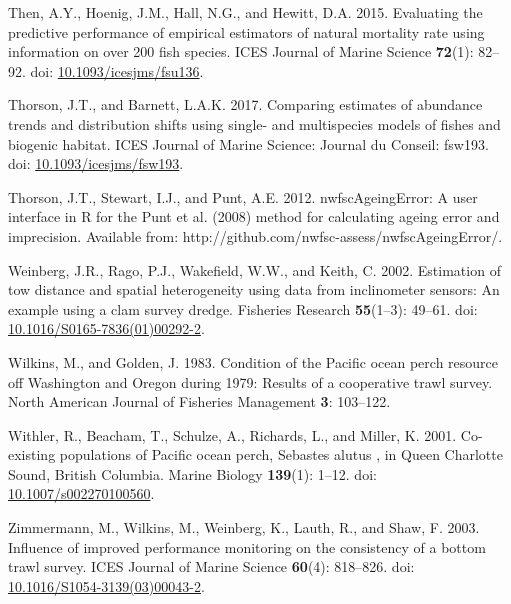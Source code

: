 \documentclass[12pt,]{article}
\begin{document}
\hypertarget{ref-then_evaluating_2015}{}
Then, A.Y., Hoenig, J.M., Hall, N.G., and Hewitt, D.A. 2015. Evaluating
the predictive performance of empirical estimators of natural mortality
rate using information on over 200 fish species. ICES Journal of Marine
Science \textbf{72}(1): 82--92. doi:
\href{https://doi.org/10.1093/icesjms/fsu136}{10.1093/icesjms/fsu136}.

\hypertarget{ref-thorson_comparing_2017}{}
Thorson, J.T., and Barnett, L.A.K. 2017. Comparing estimates of
abundance trends and distribution shifts using single- and multispecies
models of fishes and biogenic habitat. ICES Journal of Marine Science:
Journal du Conseil: fsw193. doi:
\href{https://doi.org/10.1093/icesjms/fsw193}{10.1093/icesjms/fsw193}.

\hypertarget{ref-thorson_nwfscageingerror:_2012}{}
Thorson, J.T., Stewart, I.J., and Punt, A.E. 2012. nwfscAgeingError: A
user interface in R for the Punt et al. (2008) method for calculating
ageing error and imprecision. Available from:
http://github.com/nwfsc-assess/nwfscAgeingError/.

\hypertarget{ref-weinberg_estimation_2002}{}
Weinberg, J.R., Rago, P.J., Wakefield, W.W., and Keith, C. 2002.
Estimation of tow distance and spatial heterogeneity using data from
inclinometer sensors: An example using a clam survey dredge. Fisheries
Research \textbf{55}(1--3): 49--61. doi:
\href{https://doi.org/10.1016/S0165-7836(01)00292-2}{10.1016/S0165-7836(01)00292-2}.

\hypertarget{ref-wilkins_condition_1983}{}
Wilkins, M., and Golden, J. 1983. Condition of the Pacific ocean perch
resource off Washington and Oregon during 1979: Results of a cooperative
trawl survey. North American Journal of Fisheries Management \textbf{3}:
103--122.

\hypertarget{ref-withler_co-existing_2001}{}
Withler, R., Beacham, T., Schulze, A., Richards, L., and Miller, K.
2001. Co-existing populations of Pacific ocean perch, Sebastes alutus ,
in Queen Charlotte Sound, British Columbia. Marine Biology
\textbf{139}(1): 1--12. doi:
\href{https://doi.org/10.1007/s002270100560}{10.1007/s002270100560}.

\hypertarget{ref-zimmermann_influence_2003}{}
Zimmermann, M., Wilkins, M., Weinberg, K., Lauth, R., and Shaw, F. 2003.
Influence of improved performance monitoring on the consistency of a
bottom trawl survey. ICES Journal of Marine Science \textbf{60}(4):
818--826. doi:
\href{https://doi.org/10.1016/S1054-3139(03)00043-2}{10.1016/S1054-3139(03)00043-2}.
\end{document}
